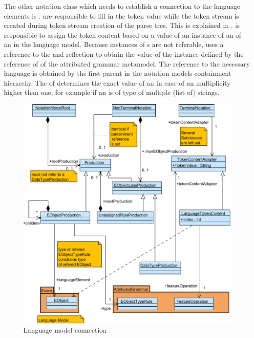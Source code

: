 The other notation class which needs to establish a connection to the language elements is .  are responsible to fill in the token value while the token stream is created during token stream creation of the parse tree. This is explained in .  is responsible to assign the token content based on a value of an instance of an  of an  in the language model. Because instances of s are not referable,  uses a reference to the  and reflection to obtain the value of the  instance defined by the  reference of  of the attributed grammar metamodel. The reference to the necessary language  is obtained by the first parent  in the notation models containment hierarchy. The  of  determines the exact value of an  in case of an multiplicity higher than one, for example if an  is of type of multiple (list of) strings. 

\begin{figure}
\centering
\includegraphics[scale=0.8]{gfx/ex/Notation_LangRel} 
\caption{Language model connection}
\label{MM:Not:LR}
\end{figure}

